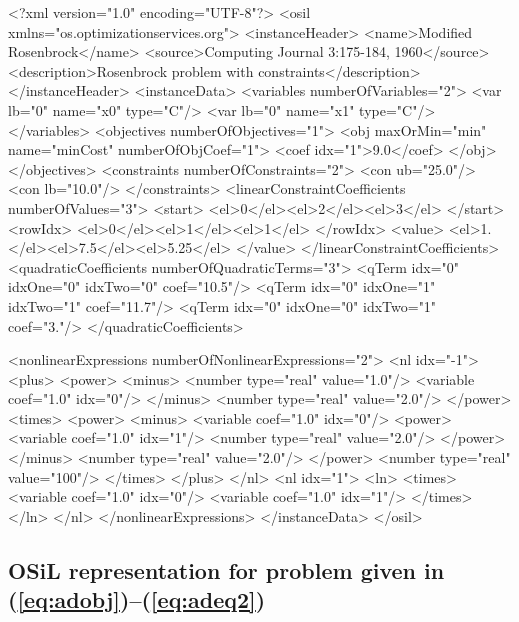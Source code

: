 \documentclass[11pt]{article}
\renewcommand{\_}{{\char"5F}}
\renewcommand{\{}{{\char"7B}}
\renewcommand{\}}{{\char"7D}}
\renewcommand{\^}{{\char"0D}}
\renewcommand{\'}{{\char"0D}}
\begin{document}
{\normalsize \baselineskip 16pt \vspace{2pt}
\begin{verbatimtab}[5]
<?xml version="1.0" encoding="UTF-8"?>
<osil xmlns="os.optimizationservices.org">
	<instanceHeader>
		<name>Modified Rosenbrock</name>
		<source>Computing Journal 3:175-184, 1960</source>
		<description>Rosenbrock problem with constraints</description>
	</instanceHeader>
	<instanceData>
		<variables numberOfVariables="2">
			<var lb="0" name="x0" type="C"/>
			<var lb="0" name="x1" type="C"/>
		</variables>
		<objectives numberOfObjectives="1">
			<obj maxOrMin="min" name="minCost" numberOfObjCoef="1">
				<coef idx="1">9.0</coef>
			</obj>
		</objectives>
		<constraints numberOfConstraints="2">
			<con ub="25.0"/>
			<con lb="10.0"/>
		</constraints>
		<linearConstraintCoefficients numberOfValues="3">
			<start>
				<el>0</el><el>2</el><el>3</el>
			</start>
			<rowIdx>
				<el>0</el><el>1</el><el>1</el>
			</rowIdx>
			<value>
				<el>1.</el><el>7.5</el><el>5.25</el>
			</value>
		</linearConstraintCoefficients>
		<quadraticCoefficients numberOfQuadraticTerms="3">
			<qTerm idx="0" idxOne="0" idxTwo="0" coef="10.5"/>
			<qTerm idx="0" idxOne="1" idxTwo="1" coef="11.7"/>
			<qTerm idx="0" idxOne="0" idxTwo="1" coef="3."/>
		</quadraticCoefficients>
\end{verbatimtab}
   \newpage
\begin{verbatimtab}[5]
		<nonlinearExpressions numberOfNonlinearExpressions="2">
			<nl idx="-1">
				<plus>
					<power>
						<minus>
							<number type="real" value="1.0"/>
							<variable coef="1.0" idx="0"/>
						</minus>
						<number type="real" value="2.0"/>
					</power>
					<times>
						<power>
							<minus>
								<variable coef="1.0" idx="0"/>
								<power>
									<variable coef="1.0" idx="1"/>
									<number type="real" value="2.0"/>
								</power>
							</minus>
							<number type="real" value="2.0"/>
						</power>
						<number type="real" value="100"/>
					</times>
				</plus>
			</nl>
			<nl idx="1">
				<ln>
					<times>
						<variable coef="1.0" idx="0"/>
						<variable coef="1.0" idx="1"/>
					</times>
				</ln>
			</nl>
		</nonlinearExpressions>
	</instanceData>
</osil>
\end{verbatimtab}

}%


\subsection{OSiL representation for problem given in (\ref{eq:adobj})--(\ref{eq:adeq2})}\label{section:adexample}
\end{document}
